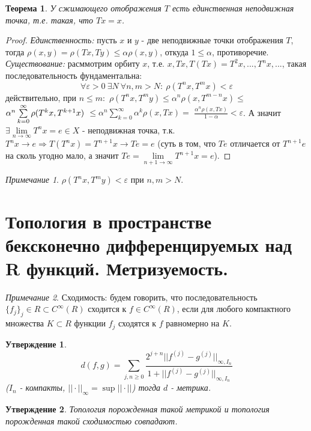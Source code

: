 \documentclass{article}
\theoremstyle{indented}
\newtheorem{theorem}{Теорема}
\newtheorem{stat}{Утверждение}
\theoremstyle{definition}
\theoremstyle{remark}
\newtheorem{remark}{Примечание}
\begin{document}
\begin{theorem}
    У сжимающего отображения $T$ есть единственная неподвижная точка, т.е. такая, что $Tx=x$. 
\end{theorem}

\begin{proof}
    \textit{Единственность:} пусть $x$ и $y$ - две неподвижные точки отображения $T$, тогда 
    $\rho (x,y) = \rho (T x, T y) \leq \alpha \rho (x,y)$, откуда $1 \leq \alpha$, противоречие. \\
    \textit{Существование:} расммотрим орбиту $x$, т.е. $x, Tx, T(Tx)=T^2 x, ... , T^n x, ...$, такая последовательность фундаментальна:
    $$\forall \varepsilon > 0 \ \exists N \ \forall n,m > N: \ \rho (T^n x, T^m x) < \varepsilon $$
    действительно, при $n \leq m:$ 
    $\rho (T^n x, T^m y) \leq \alpha^n \rho (x, T^{m-n} x) \leq $  
    $\alpha^n \sum\limits_{k=0}^{\infty} \rho (T^k x, T^{k+1} x) \\$ 
    $\leq \alpha^n \sum\limits_{k=0}^{\infty} \alpha^k \rho (x, Tx) = $
    $\frac{\alpha^n \rho (x,Tx)}{1-\alpha}  < \varepsilon$. 
    А значит $\exists \lim\limits_{n \to \infty} T^n x = e \in X$ - неподвижная точка, 
    т.к. $T^n x \to e \Rightarrow T(T^n x) = T^{n+1} x \to Te = e$ (суть в том, что $Te$ отличается от $T^{n+1}e$ на сколь угодно мало,
    а значит $Te = \lim\limits_{n+1 \to \infty} T^{n+1} x = e$).  
\end{proof}

\begin{remark}
    $\rho(T^n x, T^m y) < \varepsilon$ при $n,m>N$.
\end{remark}
\section{Топология в пространстве бексконечно дифференцируемых над R функций. Метризуемость.}

\begin{remark}
    Сходимость: будем говорить, что последовательность
    $\{f_j\}_j\in R \subset C^\infty(R)$ сходится к $f \in C^\infty(R)$, 
    если для любого компактного множества $K \subset R$ функции $f_j$
    сходятся к $f$ равномерно на $K$.
\end{remark}

\begin{stat}
    $$
    d(f,g) = \sum\limits_{j,n\geq 0} \frac{ 2^{j+n} ||f^{(j)}-g^{(j)}||_{\infty, I_n}}{1+||f^{(j)}-g^{(j)}||_{\infty, I_n}}
    $$
    ($I_n$ - компакты, $||\cdot||_\infty = \sup||\cdot||$) тогда $d$ - метрика.
\end{stat}

\begin{stat}
    Топология порожденная такой метрикой и топология порожденная такой сходимостью совпадают.
\end{stat}

\newpage
\hypertarget{t2}{}
\printindex
\end{document}
